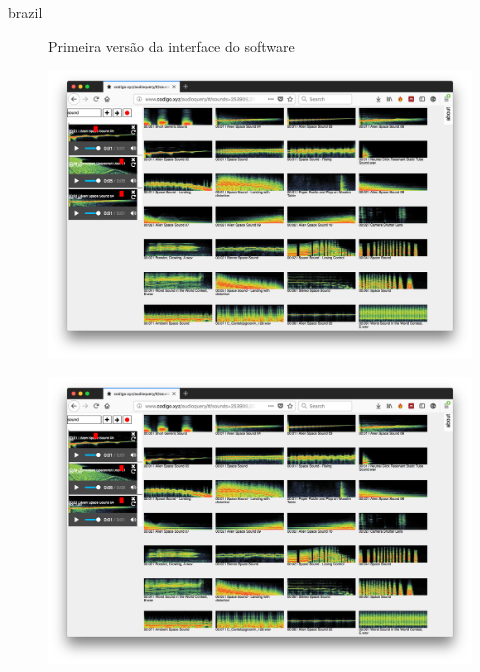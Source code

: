 \begin{otherlanguage*}{brazil}
\begin{figure}[htb]
\label{audiqueryminipage}
\centering
 \begin{minipage}{0.49\textwidth}
   \centering
   \caption{Primeira versão da interface do software} \label{fig_minipage_imagem1}
   \includegraphics[width=\textwidth]{pictures/cap4/audioquery_firefox}
 \end{minipage}
 \hfill
 \begin{minipage}{0.49\textwidth}
   \centering
   \caption{} \label{fig_minipage_grafico2}
   \includegraphics[width=\textwidth]{pictures/cap4/audioquery_firefox}
 \end{minipage}
\end{figure}




\end{otherlanguage*}

